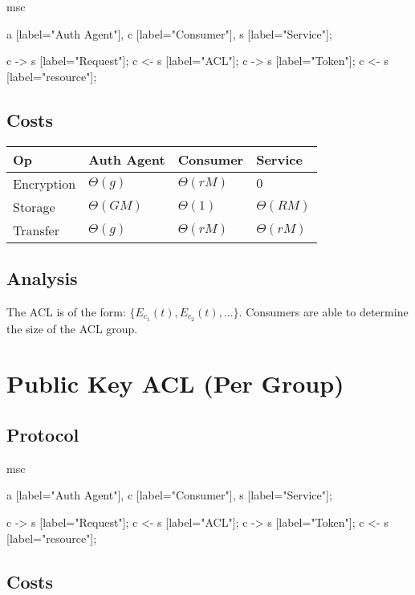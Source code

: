 \documentclass[pdftex,12pt,a4papaer]{article}
\begin{document}
\begin{msc}
msc {
    a [label="Auth Agent"],
    c [label="Consumer"],
    s [label="Service"];

    c -> s [label="Request"];
    c <- s [label="ACL"];
    c -> s [label="Token"];
    c <- s [label="resource"];
}
\end{msc}

\subsection{Costs}

\begin{tabular}{l|l|l|l}
 Op & Auth Agent & Consumer & Service \\ \hline
 Encryption & $\Theta(g)$ & $\Theta(rM)$ & $0$ \\
    Storage & $\Theta(GM)$ & $\Theta(1)$ & $\Theta(RM)$ \\
    Transfer & $\Theta(g)$ & $\Theta(rM)$ & $\Theta(rM)$
\end{tabular}

\subsection{Analysis}

The ACL is of the form: $\{E_{c_1}(t), E_{c_2}(t), ...\}$. Consumers are able to
determine the size of the ACL group.

\pagebreak

\section{Public Key ACL (Per Group)}  %

\subsection{Protocol}

\begin{msc}
msc {
    a [label="Auth Agent"],
    c [label="Consumer"],
    s [label="Service"];

    c -> s [label="Request"];
    c <- s [label="ACL"];
    c -> s [label="Token"];
    c <- s [label="resource"];
}
\end{msc}

\subsection{Costs}
\end{document}

